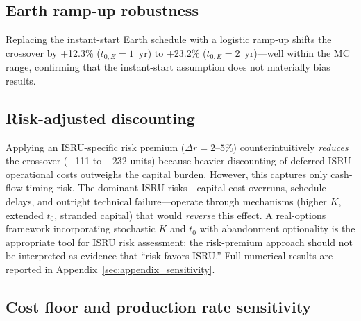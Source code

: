\documentclass[preprint,12pt]{elsarticle}
\begin{document}
\subsection{Earth ramp-up robustness}
\label{sec:earth_ramp}

Replacing the instant-start Earth schedule with a logistic ramp-up shifts the crossover by $+$12.3\% ($t_{0,E} = 1$~yr) to $+$23.2\% ($t_{0,E} = 2$~yr)---well within the MC range, confirming that the instant-start assumption does not materially bias results.

\subsection{Risk-adjusted discounting}
\label{sec:risk_premium}

Applying an ISRU-specific risk premium ($\Delta r = 2$--$5\%$) counterintuitively \emph{reduces} the crossover ($-$111 to $-$232 units) because heavier discounting of deferred ISRU operational costs outweighs the capital burden. However, this captures only cash-flow timing risk. The dominant ISRU risks---capital cost overruns, schedule delays, and outright technical failure---operate through mechanisms (higher $K$, extended $t_0$, stranded capital) that would \emph{reverse} this effect. A real-options framework incorporating stochastic $K$ and $t_0$ with abandonment optionality is the appropriate tool for ISRU risk assessment; the risk-premium approach should not be interpreted as evidence that ``risk favors ISRU.'' Full numerical results are reported in Appendix~\ref{sec:appendix_sensitivity}.

\subsection{Cost floor and production rate sensitivity}
\label{sec:cfloor_prodrate}
\end{document}
